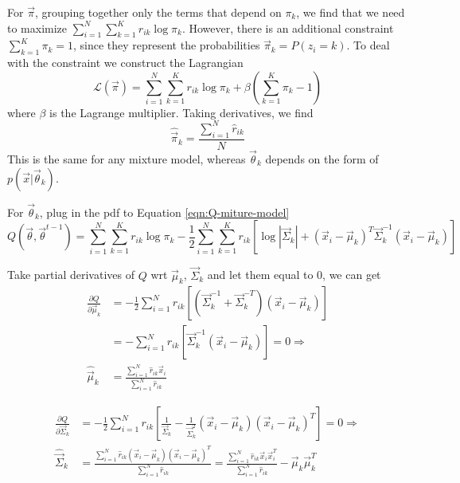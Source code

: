 For $\vec{\pi}$, grouping together only the terms that depend on $\pi_k$, we find that we need to maximize $\sum\limits_{i=1}^N{\sum\limits_{k=1}^K{r_{ik}\log \pi_k}}$. However, there is an additional constraint $\sum\limits_{k=1}^K{\pi_k}=1$, since they represent the probabilities $\vec{\pi}_k=P(z_i=k)$. To deal with the constraint we construct the Lagrangian
\begin{equation}
\mathcal{L}(\vec{\pi})=\sum\limits_{i=1}^N{\sum\limits_{k=1}^K{r_{ik}\log \pi_k}}+\beta\left(\sum\limits_{k=1}^K{\pi_k}-1\right) \nonumber
\end{equation}
where $\beta$ is the Lagrange multiplier. Taking derivatives, we find
\begin{equation}
\hat{\vec{\pi}}_k=\frac{\sum\limits_{i=1}^N \hat{r}_{ik}}{N}
\end{equation}
This is the same for any mixture model, whereas $\vec{\theta}_k$ depends on the form of $p(\vec{x}|\vec{\theta}_k)$.

For $\vec{\theta}_k$, plug in the pdf to Equation \eqref{eqn:Q-miture-model}
\begin{equation*}
Q(\vec{\theta}, \vec{\theta}^{t-1}) =\sum\limits_{i=1}^N{\sum\limits_{k=1}^K{r_{ik}\log \pi_k}}-\frac{1}{2}\sum\limits_{i=1}^N{\sum\limits_{k=1}^K{r_{ik}\left[\log |\vec{\Sigma}_k|+(\vec{x}_i-\vec{\mu}_k)^T\vec{\Sigma}_k^{-1}(\vec{x}_i-\vec{\mu}_k)\right]}}
\end{equation*}

Take partial derivatives of $Q$ wrt $\vec{\mu}_k$, $\vec{\Sigma}_k$ and let them equal to 0, we can get
\begin{align}
\frac{\partial Q}{\partial \vec{\mu}_k} & = -\frac{1}{2}\sum\limits_{i=1}^N{r_{ik}\left[(\vec{\Sigma}_k^{-1}+\vec{\Sigma}_k^{-T})(\vec{x}_i-\vec{\mu}_k)\right]} \nonumber \\
    &  =-\sum\limits_{i=1}^N{r_{ik}\left[\vec{\Sigma}_k^{-1}(\vec{x}_i-\vec{\mu}_k)\right]}=0 \Rightarrow \nonumber \\
\hat{\vec{\mu}}_k & = \frac{\sum_{i=1}^N \hat{r}_{ik}\vec{x}_i}{\sum_{i=1}^N \hat{r}_{ik}}
\end{align}

\begin{align}
\frac{\partial Q}{\partial \vec{\Sigma}_k} & = -\frac{1}{2}\sum\limits_{i=1}^N{r_{ik}\left[\frac{1}{\vec{\Sigma}_k}-\frac{1}{\vec{\Sigma}_k^2}(\vec{x}_i-\vec{\mu}_k)(\vec{x}_i-\vec{\mu}_k)^T\right]}=0 \Rightarrow \nonumber \\
\hat{\vec{\Sigma}}_k & = \frac{\sum_{i=1}^N \hat{r}_{ik}(\vec{x}_i-\vec{\mu}_k)(\vec{x}_i-\vec{\mu}_k)^T}{\sum_{i=1}^N \hat{r}_{ik}}=\frac{\sum_{i=1}^N \hat{r}_{ik}\vec{x}_i\vec{x}_i^T}{\sum_{i=1}^N \hat{r}_{ik}}-\vec{\mu}_k\vec{\mu}_k^T
\end{align}


